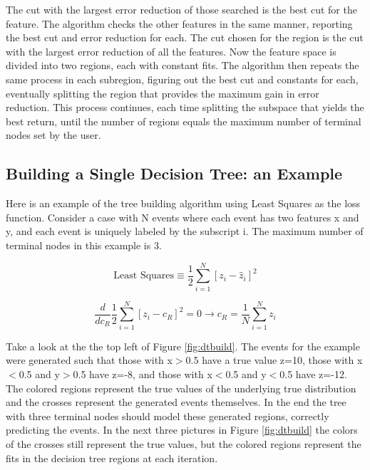 \documentclass[12pt]{article}
\begin{document}
The cut with the largest error reduction of those searched is the best cut for the feature. The algorithm checks the other features in the same manner, reporting the best cut and error reduction for each. The cut chosen for the region is the cut with the largest error reduction of all the features. Now the feature space is divided into two regions, each with constant fits. The algorithm then repeats the same process in each subregion, figuring out the best cut and constants for each, eventually splitting the region that provides the maximum gain in error reduction. This process continues, each time splitting the subspace that yields the best return, until the number of regions equals the maximum number of terminal nodes set by the user. 

\subsection{Building a Single Decision Tree: an Example}

Here is an example of the tree building algorithm using Least Squares as the loss function. Consider a case with N events where each event has two features x and y, and each event is uniquely labeled by the subscript i. The maximum number of terminal nodes in this example is 3.

\begin{equation}
\textrm{Least Squares} \equiv \frac{1}{2}\sum_{i=1}^{N} [z_i-\hat{z}_i]^2
\end{equation}

\begin{equation}
\frac{d}{dc_R}\frac{1}{2}\sum_{i=1}^{N} [z_i-c_R]^2 = 0 \rightarrow c_R = \frac{1}{N}\sum_{i=1}^{N}z_i
\end{equation}

Take a look at the the top left of Figure \ref{fig:dtbuild}. The events for the example were generated such that those with x$>$0.5 have a true value z=10, those with x$<$0.5 and y$>$0.5 have z=-8, and those with x$<$0.5 and y$<$0.5 have z=-12. The colored regions represent the true values of the underlying true distribution and the crosses represent the generated events themselves. In the end the tree with three terminal nodes should model these generated regions, correctly predicting the events. In the next three pictures in Figure \ref{fig:dtbuild} the colors of the crosses still represent the true values, but the colored regions represent the fits in the decision tree regions at each iteration.
\end{document}

